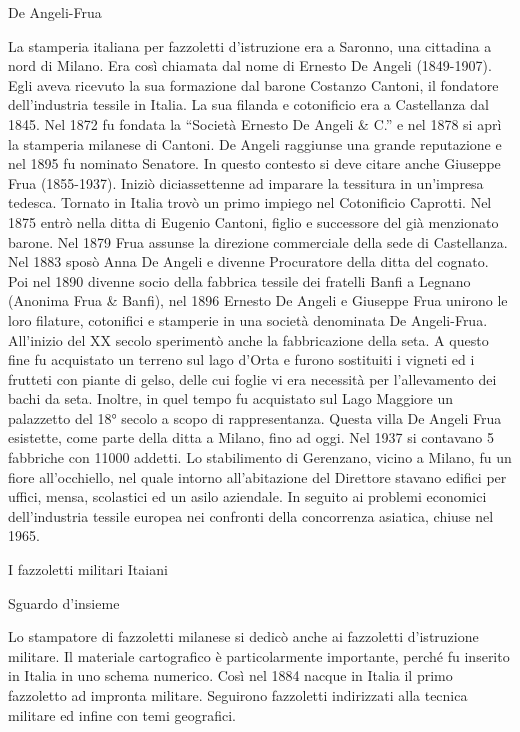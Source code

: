 De Angeli-Frua

La stamperia italiana per fazzoletti d'istruzione era a Saronno, una
cittadina a nord di Milano. Era così chiamata dal nome di Ernesto De
Angeli (1849-1907). Egli aveva ricevuto la sua formazione dal barone
Costanzo Cantoni, il fondatore dell'industria tessile in Italia. La sua
filanda e cotonificio era a Castellanza dal 1845. Nel 1872 fu fondata la
``Società Ernesto De Angeli \& C.'' e nel 1878 si aprì la stamperia
milanese di Cantoni. De Angeli raggiunse una grande reputazione e nel
1895 fu nominato Senatore. In questo contesto si deve citare anche
Giuseppe Frua (1855-1937). Iniziò diciassettenne ad imparare la
tessitura in un'impresa tedesca. Tornato in Italia trovò un primo
impiego nel Cotonificio Caprotti. Nel 1875 entrò nella ditta di Eugenio
Cantoni, figlio e successore del già menzionato barone. Nel 1879 Frua
assunse la direzione commerciale della sede di Castellanza. Nel 1883
sposò Anna De Angeli e divenne Procuratore della ditta del cognato. Poi
nel 1890 divenne socio della fabbrica tessile dei fratelli Banfi a
Legnano (Anonima Frua \& Banfi), nel 1896 Ernesto De Angeli e Giuseppe
Frua unirono le loro filature, cotonifici e stamperie in una società
denominata De Angeli-Frua. All'inizio del XX secolo sperimentò anche la
fabbricazione della seta. A questo fine fu acquistato un terreno sul
lago d'Orta e furono sostituiti i vigneti ed i frutteti con piante di
gelso, delle cui foglie vi era necessità per l'allevamento dei bachi da
seta. Inoltre, in quel tempo fu acquistato sul Lago Maggiore un
palazzetto del 18° secolo a scopo di rappresentanza. Questa villa De
Angeli Frua esistette, come parte della ditta a Milano, fino ad oggi.
Nel 1937 si contavano 5 fabbriche con 11000 addetti. Lo stabilimento di
Gerenzano, vicino a Milano, fu un fiore all'occhiello, nel quale intorno
all'abitazione del Direttore stavano edifici per uffici, mensa,
scolastici ed un asilo aziendale. In seguito ai problemi economici
dell'industria tessile europea nei confronti della concorrenza asiatica,
chiuse nel 1965.

I fazzoletti militari Itaiani

Sguardo d'insieme

Lo stampatore di fazzoletti milanese si dedicò anche ai fazzoletti
d'istruzione militare. Il materiale cartografico è particolarmente
importante, perché fu inserito in Italia in uno schema numerico. Così
nel 1884 nacque in Italia il primo fazzoletto ad impronta militare.
Seguirono fazzoletti indirizzati alla tecnica militare ed infine con
temi geografici.

